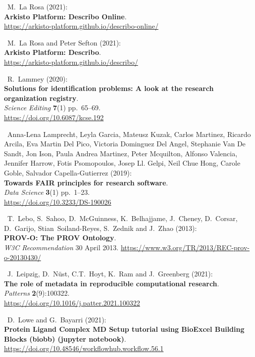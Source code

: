 \begin{thebibliography}{9}
~M.~La Rosa (2021):\\
\textbf{Arkisto Platform: Describo Online}.\\
\url{https://arkisto-platform.github.io/describo-online/}

~M.~La Rosa and Peter Sefton (2021):\\
\textbf{Arkisto Platform: Describo}.\\
\url{https://arkisto-platform.github.io/describo/}

~R.~Lammey (2020):\\
\textbf{Solutions for identification problems: A look at the research
organization registry}.\\
\emph{Science Editing} \textbf{7}(1) pp.~65--69.\\
\url{https://doi.org/10.6087/kcse.192}

~Anna-Lena Lamprecht, Leyla Garcia, Mateusz Kuzak, Carlos
Martinez, Ricardo Arcila, Eva Martin Del Pico, Victoria Dominguez Del
Angel, Stephanie Van De Sandt, Jon Ison, Paula Andrea Martinez, Peter
Mcquilton, Alfonso Valencia, Jennifer Harrow, Fotis Psomopoulos, Josep
Ll. Gelpi, Neil Chue Hong, Carole Goble, Salvador Capella-Gutierrez
(2019):\\
\textbf{Towards FAIR principles for research software}.\\
\emph{Data Science} \textbf{3}(1) pp.~1--23.\\
\url{https://doi.org/10.3233/DS-190026}

~T.~Lebo, S.~Sahoo, D.~McGuinness, K.~Belhajjame, J.~Cheney,
D.~Corsar, D.~Garijo, Stian~Soiland-Reyes, S.~Zednik and J.~Zhao
(2013):\\
\textbf{PROV-O: The PROV Ontology}.\\
\emph{W3C Recommendation} 30 April 2013.
\url{https://www.w3.org/TR/2013/REC-prov-o-20130430/}

~J.~Leipzig, D.~Nüst, C.T.~Hoyt, K.~Ram and J.~Greenberg
(2021):\\
\textbf{The role of metadata in reproducible computational research}.\\
\emph{Patterns} \textbf{2}(9):100322.\\
\url{https://doi.org/10.1016/j.patter.2021.100322}

~D.~Lowe and G.~Bayarri (2021):\\
\textbf{Protein Ligand Complex MD Setup tutorial using BioExcel Building
Blocks (biobb) (jupyter notebook)}.\\
\url{https://doi.org/10.48546/workflowhub.workflow.56.1}


\end{thebibliography}
